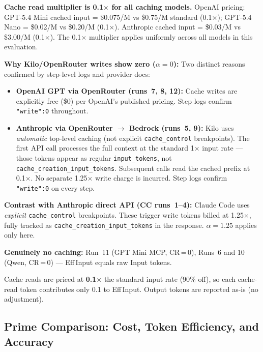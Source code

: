 \noindent
\textbf{Cache read multiplier is 0.1$\times$ for all caching models.}
OpenAI pricing: GPT-5.4 Mini cached input = \$0.075/M vs \$0.75/M standard (0.1$\times$);
GPT-5.4 Nano = \$0.02/M vs \$0.20/M (0.1$\times$).
Anthropic cached input = \$0.03/M vs \$3.00/M (0.1$\times$).
The 0.1$\times$ multiplier applies uniformly across all models in this evaluation.

\textbf{Why Kilo/OpenRouter writes show zero ($\alpha = 0$):}
Two distinct reasons confirmed by step-level logs and provider docs:
\begin{itemize}[nosep, leftmargin=*]
  \item \textbf{OpenAI GPT via OpenRouter (runs~7, 8, 12):}
        Cache writes are explicitly free (\$0) per OpenAI's published pricing.
        Step logs confirm \texttt{"write":0} throughout.
  \item \textbf{Anthropic via OpenRouter $\to$ Bedrock (runs~5, 9):}
        Kilo uses \emph{automatic} top-level caching (not explicit
        \texttt{cache\_control} breakpoints).
        The first API call processes the full context at the standard 1$\times$ input rate
        --- those tokens appear as regular \texttt{input\_tokens}, not
        \texttt{cache\_creation\_input\_tokens}.
        Subsequent calls read the cached prefix at 0.1$\times$.
        No separate 1.25$\times$ write charge is incurred.
        Step logs confirm \texttt{"write":0} on every step.
\end{itemize}

\textbf{Contrast with Anthropic direct API (CC runs~1--4):}
Claude Code uses \emph{explicit} \texttt{cache\_control} breakpoints.
These trigger write tokens billed at 1.25$\times$, fully tracked as
\texttt{cache\_creation\_input\_tokens} in the response.
$\alpha = 1.25$ applies only here.

\textbf{Genuinely no caching:}
Run~11 (GPT Mini MCP, CR\,=\,0), Runs~6 and 10 (Qwen, CR\,=\,0) ---
Eff\,Input equals raw Input tokens.

Cache reads are priced at \textbf{0.1$\times$} the standard input rate (90\% off),
so each cache-read token contributes only 0.1 to Eff\,Input.
Output tokens are reported as-is (no adjustment).

\subsection{Prime Comparison: Cost, Token Efficiency, and Accuracy}
\label{sec:prime}

